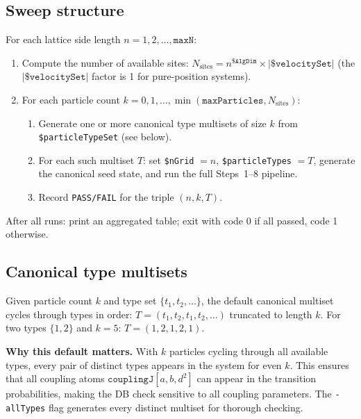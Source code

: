 \documentclass[12pt,a4paper]{article}
\begin{document}
\subsection{Sweep structure}

For each lattice side length $n = 1, 2, \ldots, \texttt{maxN}$:
\begin{enumerate}
  \item Compute the number of available sites:
    $N_{\text{sites}} = n^{\texttt{\$AlgDim}} \times |\texttt{\$velocitySet}|$
    (the $|\texttt{\$velocitySet}|$ factor is 1 for pure-position systems).
  \item For each particle count $k = 0, 1, \ldots, \min(\texttt{maxParticles},
    N_{\text{sites}})$:
  \begin{enumerate}
    \item Generate one or more canonical type multisets of size $k$ from
      \texttt{\$particleTypeSet} (see below).
    \item For each such multiset $T$: set \texttt{\$nGrid} $= n$,
      \texttt{\$particleTypes} $= T$, generate the canonical seed state, and
      run the full Steps~1--8 pipeline.
    \item Record \texttt{PASS/FAIL} for the triple $(n, k, T)$.
  \end{enumerate}
\end{enumerate}
After all runs: print an aggregated table; exit with code 0 if all passed,
code 1 otherwise.

\subsection{Canonical type multisets}

Given particle count $k$ and type set $\{t_1, t_2, \ldots\}$, the default
canonical multiset cycles through types in order:
$T = (t_1, t_2, t_1, t_2, \ldots)$ truncated to length $k$.  For two types
$\{1,2\}$ and $k = 5$: $T = (1, 2, 1, 2, 1)$.

\begin{infobox}
\textbf{Why this default matters.}  With $k$ particles cycling through all
available types, every pair of distinct types appears in the system for even
$k$.  This ensures that all coupling atoms $\texttt{couplingJ}[a,b,d^2]$ can
appear in the transition probabilities, making the DB check sensitive to all
coupling parameters.  The \texttt{-allTypes} flag generates every distinct
multiset for thorough checking.
\end{infobox}
\end{document}
